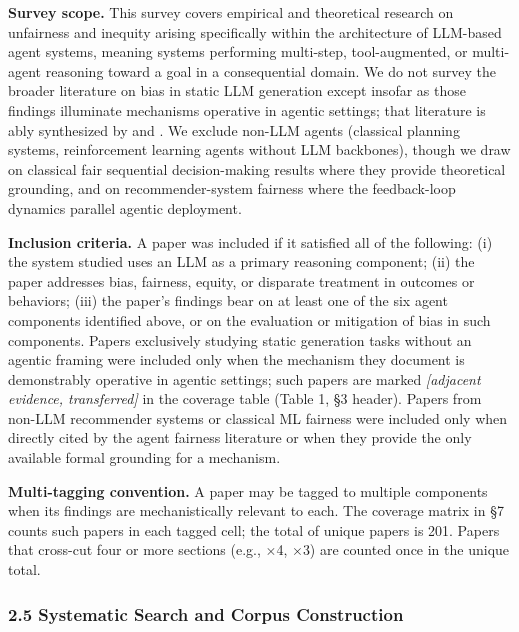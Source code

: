 \documentclass[10pt]{article}
\begin{document}
\textbf{Survey scope.} This survey covers empirical and theoretical research on unfairness and inequity arising specifically within the architecture of LLM-based agent systems, meaning systems performing multi-step, tool-augmented, or multi-agent reasoning toward a goal in a consequential domain. We do not survey the broader literature on bias in static LLM generation except insofar as those findings illuminate mechanisms operative in agentic settings; that literature is ably synthesized by \cite{gallegos2024bias} and \cite{chu2024fairness}. We exclude non-LLM agents (classical planning systems, reinforcement learning agents without LLM backbones), though we draw on classical fair sequential decision-making results \cite{hu2022achieving,xu2024adapting} where they provide theoretical grounding, and on recommender-system fairness \cite{zehlike2022fairness,wang2023survey} where the feedback-loop dynamics parallel agentic deployment.

\textbf{Inclusion criteria.} A paper was included if it satisfied all of the following: (i) the system studied uses an LLM as a primary reasoning component; (ii) the paper addresses bias, fairness, equity, or disparate treatment in outcomes or behaviors; (iii) the paper's findings bear on at least one of the six agent components identified above, or on the evaluation or mitigation of bias in such components. Papers exclusively studying static generation tasks without an agentic framing were included only when the mechanism they document is demonstrably operative in agentic settings; such papers are marked \emph{[adjacent evidence, transferred]} in the coverage table (Table 1, \S{}3 header). Papers from non-LLM recommender systems or classical ML fairness were included only when directly cited by the agent fairness literature or when they provide the only available formal grounding for a mechanism.

\textbf{Multi-tagging convention.} A paper may be tagged to multiple components when its findings are mechanistically relevant to each. The coverage matrix in \S{}7 counts such papers in each tagged cell; the total of unique papers is 201. Papers that cross-cut four or more sections (e.g., \cite{gallegos2024bias} $\times$4, \cite{fan2024fairmt} $\times$3) are counted once in the unique total.


\subsubsection*{2.5 Systematic Search and Corpus Construction}
\end{document}
